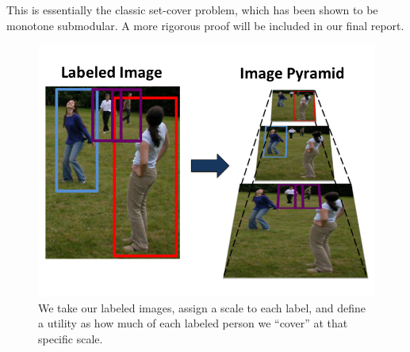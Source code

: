 \documentclass[11pt]{article}
\begin{document}
This is essentially the classic set-cover problem, which has been shown to be monotone submodular. A more rigorous proof will be included in our final report.

\begin{figure}
  \centering
  \includegraphics[trim=0 40 0 40, clip=true, width=0.7\columnwidth]{./images/pyramid.png} 
  \caption{We take our labeled images, assign a scale to each label, and define a utility as how much of each labeled person we ``cover'' at that specific scale.}
  \label{fig:pyramid}
\end{figure}
\end{document}
